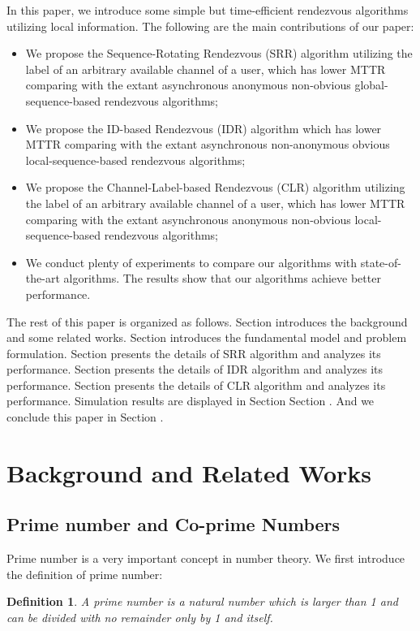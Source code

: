 \documentclass[10pt, conference, letterpaper]{IEEEtran}
\newtheorem{definition}{Definition}[section]
\begin{document}
In this paper, we introduce some simple but time-efficient rendezvous algorithms utilizing local information. The following are the main contributions of our paper:
\begin{itemize}
\item[1)] We propose the Sequence-Rotating Rendezvous (SRR) algorithm utilizing the label of an arbitrary available channel of a user, which has lower MTTR comparing with the extant asynchronous anonymous non-obvious global-sequence-based rendezvous algorithms;
\item[2)] We propose the ID-based Rendezvous (IDR) algorithm which has lower MTTR comparing with the extant asynchronous non-anonymous obvious local-sequence-based rendezvous algorithms;
\item[3)] We propose the Channel-Label-based Rendezvous (CLR) algorithm utilizing the label of an arbitrary available channel of a user, which has lower MTTR comparing with the extant asynchronous anonymous non-obvious local-sequence-based rendezvous algorithms;
\item[4)] We conduct plenty of experiments to compare our algorithms with state-of-the-art algorithms. The results show that our algorithms achieve better performance.
\end{itemize}


The rest of this paper is organized as follows. Section \uppercase\expandafter{} introduces the background and some related works. Section \uppercase\expandafter{} introduces the fundamental model and problem formulation. Section \uppercase\expandafter{} presents the details of SRR algorithm and analyzes its performance. Section \uppercase\expandafter{} presents the details of IDR algorithm and analyzes its performance. Section \uppercase\expandafter{} presents the details of CLR algorithm and analyzes its performance. Simulation results are displayed in Section Section \uppercase\expandafter{}. And we conclude this paper in Section \uppercase\expandafter{}.




\section{Background and Related Works}


\subsection{Prime number and Co-prime Numbers}
Prime number is a very important concept in number theory. We first introduce the definition of prime number:
\begin{definition}
A prime number is a natural number which is larger than 1 and can be divided with no remainder only by 1 and itself.
\end{definition}
\end{document}
